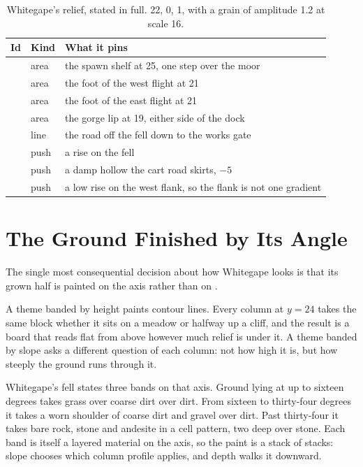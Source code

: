 \begin{table}[htbp]
\caption{Whitegape's relief, stated in full.  22,  0,
 1, with a grain of amplitude 1.2 at scale 16.}
\label{tab:whitegape-relief}
\small
\begin{tabularx}{\textwidth}{L{3.0cm} L{1.8cm} Y}
\toprule
\textbf{Id} & \textbf{Kind} & \textbf{What it pins} \\
\midrule
{}        & area & the spawn shelf at 25, one step over the moor \\
 & area & the foot of the west flight at 21 \\
 & area & the foot of the east flight at 21 \\
       & area & the gorge lip at 19, either side of the dock \\
      & line & the road off the fell down to the works gate \\
\midrule
{} & push & a rise on the fell \\
 & push & a damp hollow the cart road skirts, $-5$ \\
  & push & a low rise on the west flank, so the flank is not one gradient \\
\bottomrule
\end{tabularx}
\end{table}

\section{The Ground Finished by Its Angle}

The single most consequential decision about how Whitegape looks is that its
grown half is painted on the  axis rather than on .

A theme banded by height paints contour lines. Every column at $y=24$ takes the
same block whether it sits on a meadow or halfway up a cliff, and the result is
a board that reads flat from above however much relief is under it. A theme
banded by slope asks a different question of each column: not how high it is,
but how steeply the ground runs through it.

Whitegape's fell states three bands on that axis. Ground lying at up to
sixteen degrees takes grass over coarse dirt over dirt. From sixteen to
thirty-four degrees it takes a worn shoulder of coarse dirt and gravel over
dirt. Past thirty-four it takes bare rock, stone and andesite in a cell
pattern, two deep over stone. Each band is itself a layered material on the
 axis, so the paint is a stack of stacks: slope chooses which
column profile applies, and depth walks it downward.

